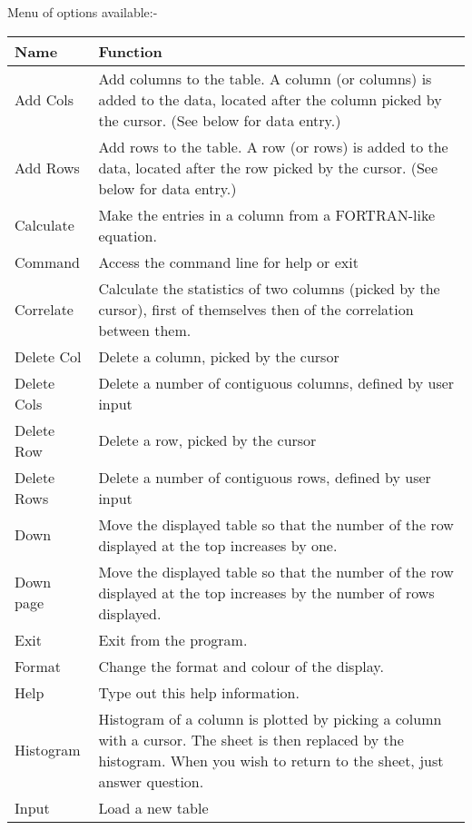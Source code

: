\begin{small}
{{ Menu of options available:-
 
\begin{tabular}{|l|p{4.5in}|}\hline
 Name      &    Function \\ \hline
 Add Cols  &    Add columns to the table. A column (or columns)
                is added to the data, located after the
                column picked by the cursor. (See below for
                data entry.) \\
 Add Rows   &   Add rows to the table. A row (or rows)
                is added to the data, located after the
                row picked by the cursor. (See below for
                data entry.) \\
 Calculate   &  Make the entries in a column from a FORTRAN-like
                equation. \\
 Command     &  Access the command line for help or exit \\
 Correlate   &  Calculate the statistics of two columns
                (picked by the cursor), first of themselves
                then of the correlation between them. \\
 Delete Col  &  Delete a column, picked by the cursor \\
 Delete Cols &  Delete a number of contiguous columns, defined
                by user input \\
 Delete Row  &  Delete a row, picked by the cursor \\
 Delete Rows &  Delete a number of contiguous rows, defined
                by user input \\
 Down        &  Move the displayed table so that the number
                of the row displayed at the top increases
                by one. \\
 Down page   &  Move the displayed table so that the number
                of the row displayed at the top increases
                by the number of rows displayed. \\
 Exit        &  Exit from the program. \\
 Format      &  Change the format and colour of the display. \\
 Help        &  Type out this help information. \\
 Histogram   &  Histogram of a column is plotted by picking a
                column with a cursor. The sheet is then
                replaced by the histogram. When you wish
                to return to the sheet, just answer question. \\
 Input       &  Load a new table \\

\end{tabular}}}
\end{small}
